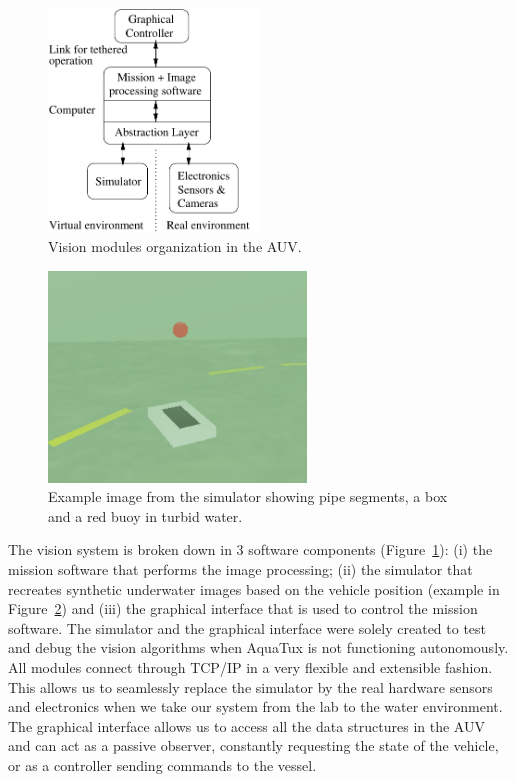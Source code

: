 \begin{figure}
\begin{center}
 \includegraphics[width=2.2in]{fig/vision}
\caption{Vision modules organization in the AUV.}\label{vision}
\end{center}
\end{figure}


\begin{figure}
\begin{center}
 \includegraphics[width=2.7in]{fig/sim}
\caption{Example image from the simulator showing pipe segments, a box
  and a red buoy in turbid water.}\label{sim}
\end{center}
\end{figure}

The vision system is broken down in 3
software components (Figure~\ref{vision}): (i) the mission software that performs the image
processing; (ii) the simulator that recreates synthetic underwater
images based on the vehicle position (example in
Figure~\ref{sim}) and (iii) the graphical interface that is used to
control the mission software. The simulator and the graphical
interface were solely created to test and debug the vision
algorithms when AquaTux is not functioning autonomously. All modules connect through TCP/IP in a
very flexible and extensible fashion. This allows us to seamlessly
replace the simulator by the real hardware sensors and electronics
when we take our system from the lab to the water environment. The
graphical interface allows us to access all the data structures in the
AUV and can act as a passive observer, constantly requesting the
state of the vehicle, or as a controller sending commands to the
vessel.




